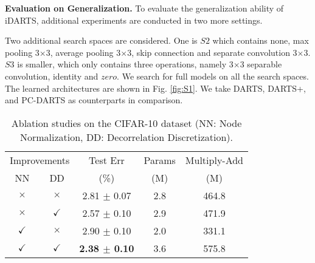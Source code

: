 \documentclass[journal]{IEEEtran}
\begin{document}
\label{EXP.Gen}
\textbf{Evaluation on Generalization.} To evaluate the generalization ability of iDARTS, additional experiments are conducted in two more settings.



Two additional search spaces are considered. One is $S2$ which contains none, max pooling 3$\times$3, average pooling 3$\times$3, skip connection and separate convolution 3$\times$3. $S3$ is smaller, which only contains three operations, namely 3$\times$3 separable convolution, identity and $zero$. We search for full models on all the search spaces. The learned architectures are shown in Fig. \ref{fig:S1}. We take DARTS, DARTS+, and PC-DARTS as counterparts in comparison.





\begin{table}[!htpb]
\begin{center}
\caption{Ablation studies on the CIFAR-10 dataset (NN: Node Normalization, DD: Decorrelation Discretization).} 
\begin{tabular}{c|c|c|c|c}
\hline
\hline
\multicolumn{2}{c|}{Improvements} & Test Err & Params & Multiply-Add \\
\cline{1-5}
 NN & DD & (\%) & (M) & (M)\\
\hline

$\times$ & $\times$ & 2.81 $\pm$ 0.07 &  2.8 & 464.8\\
$\times$ & $\checkmark$ & 2.57 $\pm$ 0.10 & 2.9 & 471.9\\
$\checkmark$ & $\times$ & 2.90 $\pm$ 0.10 & 2.0 & 331.1\\
$\checkmark$ & $\checkmark$ & \textbf{2.38 $\pm$ 0.10} & 3.6 & 575.8\\
\hline
\hline
\end{tabular}
\label{T.Ablation}
\end{center}
\end{table}
\end{document}
